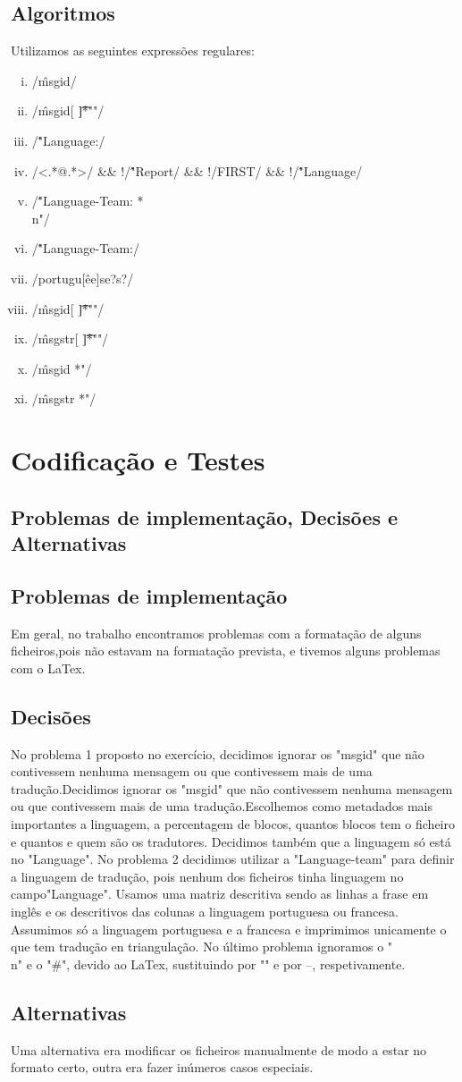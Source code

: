 \documentclass{report}
\def\titulo#1{\section{#1}}
\begin{document}
\section{Algoritmos}
Utilizamos as seguintes expressões regulares:
\begin{enumerate}[i)]
\item /\^ msgid/
\item /\^ msgid[ \t]*""/
\item /\^ "Language:/
\item /<.*@.*>/ \&\& !/\^"Report/ \&\& !/FIRST/ \&\& !/\^"Language/
\item /\^ "Language-Team: *\\n"/
\item /\^ "Language-Team:/
\item /portugu[êe]se?s?/
\item /\^ msgid[ \t]*""/
\item /\^ msgstr[ \t]*""/
\item /\^ msgid *"/
\item /\^ msgstr *"/
\end{enumerate}




\chapter{Codificação e Testes}
\section{Problemas de implementação, Decisões e Alternativas}
\titulo{Problemas de implementação}
Em geral, no trabalho encontramos problemas com a formatação de alguns ficheiros,pois não estavam na formatação prevista, e tivemos alguns problemas com o LaTex.
\titulo{Decisões}
No problema 1 proposto no exercício, decidimos ignorar os "msgid" que não contivessem nenhuma mensagem ou que contivessem mais de uma tradução.Decidimos ignorar os "msgid" que não contivessem nenhuma mensagem ou que contivessem mais de uma tradução.Escolhemos como metadados mais importantes a linguagem, a percentagem de blocos, quantos blocos tem o ficheiro e quantos e quem são os tradutores. Decidimos também que a linguagem só está no "Language".
No problema 2 decidimos utilizar a "Language-team" para definir a linguagem de tradução, pois nenhum dos ficheiros tinha linguagem no campo"Language". Usamos uma matriz descritiva sendo as linhas a frase em inglês e os descritivos das colunas a linguagem portuguesa ou francesa. Assumimos só a linguagem portuguesa e a francesa e imprimimos unicamente o que tem tradução en triangulação.
No último problema ignoramos o "\\n" e o "\#", devido ao LaTex, sustituindo por "" e por --, respetivamente.
\titulo{Alternativas}
Uma alternativa era modificar os ficheiros manualmente de modo a estar no formato certo, outra era fazer inúmeros casos especiais.
\end{document}

